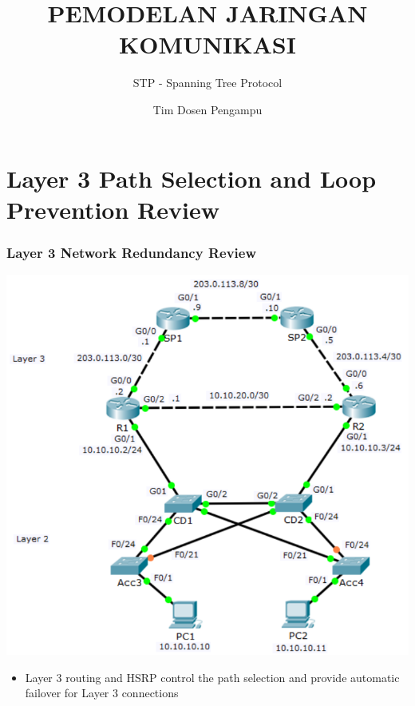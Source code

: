 \documentclass[pdflatex,compress,mathserif]{beamer}
\title{PEMODELAN JARINGAN KOMUNIKASI}
\subtitle{STP - Spanning Tree Protocol}
\author{Tim Dosen Pengampu}
\begin{document}
	
\maketitle

\section{Layer 3 Path Selection and Loop Prevention Review}

\begin{frame}
	\frametitle{Layer 3 Network Redundancy Review}
	\begin{multicols}{2}
		\begin{center}
			\includegraphics[width=\linewidth]{img/img01}
		\end{center}
		\columnbreak
		\begin{itemize}
			\item Layer 3 routing and HSRP control the
path selection and provide automatic
failover for Layer 3 connections
		\end{itemize}
	\end{multicols}
\end{frame}
\end{document}
